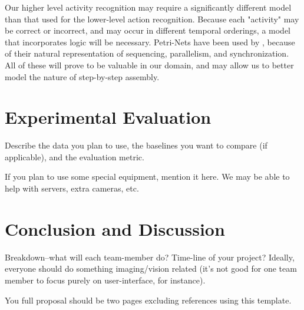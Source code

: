 \documentclass[10pt,letterpaper]{article}
\begin{document}
Our higher level activity recognition may require a significantly different model than that used for the lower-level action recognition. Because each "activity" may be correct or incorrect, and may occur in different temporal orderings, a model that incorporates logic will be necessary. Petri-Nets have been used by \cite{castel1996going}, because of their natural representation of sequencing, parallelism, and synchronization. All of these will prove to be valuable in our domain, and may allow us to better model the nature of step-by-step assembly.

\section{Experimental Evaluation}
 

Describe the data you plan to use, the baselines you want to compare (if applicable), and the evaluation metric.

If you plan to use some special equipment, mention it here.   We may be able to help with servers, extra cameras, etc.

 
\section{Conclusion and Discussion}
 
Breakdown--what will each team-member do? Time-line of your project? Ideally, everyone should do something imaging/vision related (it's not good for one team member to focus purely on user-interface, for instance).

You full proposal should be two pages excluding references using this template.

\clearpage

{\small


}
\end{document}
